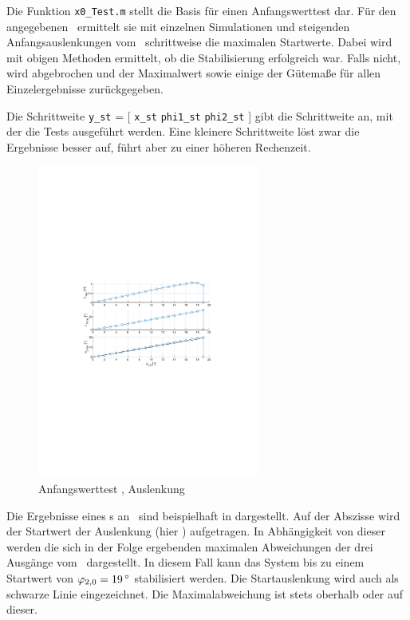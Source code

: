 Die Funktion \texttt{x0\_Test.m} stellt die Basis für einen Anfangswerttest dar.
Für den angegebenen \ap\ ermittelt sie mit einzelnen Simulationen und steigenden Anfangsauslenkungen vom \ap\ schrittweise die maximalen Startwerte.
Dabei wird mit obigen Methoden ermittelt, ob die Stabilisierung erfolgreich war.
Falls nicht, wird abgebrochen und der Maximalwert sowie einige der Gütemaße für allen Einzelergebnisse zurückgegeben.

Die Schrittweite \texttt{y\_st} = [ \texttt{x\_st} \texttt{phi1\_st} \texttt{phi2\_st} ] gibt die Schrittweite an, mit der die Tests ausgeführt werden.
Eine kleinere Schrittweite löst zwar die Ergebnisse besser auf, führt aber zu einer höheren Rechenzeit.

\begin{figure}[hb]
	\centering
		\includegraphics[width=0.65\textwidth]{Bilder/x0test/appr-x0-ap42.pdf}
	\caption{Anfangswerttest \apv, Auslenkung \phz}
	\label{fig:x0test}
\end{figure}

Die Ergebnisse eines \xots s an \apv\ sind beispielhaft in  dargestellt.
Auf der Abszisse wird der Startwert der Auslenkung (hier \phz) aufgetragen.
In Abhängigkeit von dieser werden die sich in der Folge ergebenden maximalen Abweichungen der drei Ausgänge vom \ap\ dargestellt.
In diesem Fall kann das System bis zu einem Startwert von $\phzo=\valdeg{19}$ stabilisiert werden.
Die Startauslenkung wird auch als schwarze Linie eingezeichnet. 
Die Maximalabweichung ist stets oberhalb oder auf dieser.


